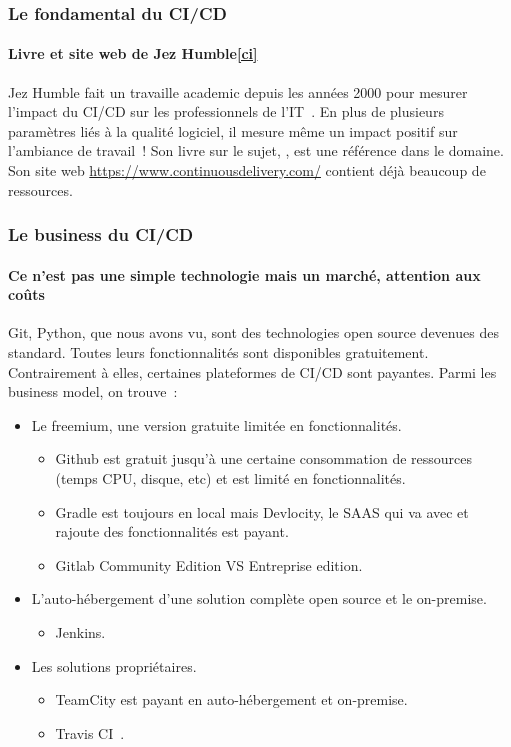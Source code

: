 \documentclass{beamer}
\begin{document}
    \begin{frame}
        \frametitle{Le fondamental du CI/CD}
        \framesubtitle{Livre et site web de Jez Humble\cref{ci}}
        \transdissolve
        Jez Humble fait un travaille academic depuis les années 2000 pour mesurer l'impact du CI/CD sur les professionnels de l'IT~.
        \bigbreak
        En plus de plusieurs paramètres liés à la qualité logiciel, il mesure même un impact positif sur l'ambiance de travail~!
        \bigbreak
        Son livre sur le sujet, , est une référence dans le domaine.
        Son site web \url{https://www.continuousdelivery.com/} contient déjà beaucoup de ressources.
    \end{frame}

    \begin{frame}
        \frametitle{Le business du CI/CD}
        \framesubtitle{Ce n'est pas une simple technologie mais un marché, attention aux coûts}
        \transdissolve
        Git, Python, que nous avons vu, sont des technologies open source devenues des standard.
        Toutes leurs fonctionnalités sont disponibles gratuitement.
        Contrairement à elles, certaines plateformes de CI/CD sont payantes.
        \bigbreak
        Parmi les business model, on trouve~:
        \begin{itemize}
            \item Le freemium, une version gratuite limitée en fonctionnalités.
            \begin{itemize}
                \item Github est gratuit jusqu'à une certaine consommation de ressources (temps CPU, disque, etc) et est limité en fonctionnalités.
                \item Gradle est toujours  en local mais Devlocity, le SAAS qui va avec et rajoute des fonctionnalités est payant.
                \item Gitlab Community Edition VS Entreprise edition.
            \end{itemize}
            \item L'auto-hébergement d'une solution complète open source et le on-premise.
            \begin{itemize}
                \item Jenkins.
            \end{itemize}
            \item Les solutions propriétaires.
            \begin{itemize}
                \item TeamCity est payant en auto-hébergement et on-premise.
                \item Travis CI~.
            \end{itemize}
        \end{itemize}
    \end{frame}
\end{document}
